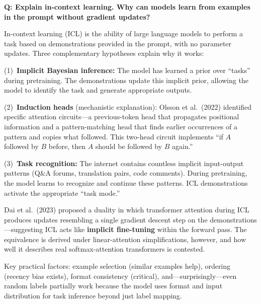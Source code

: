 \begin{interviewq}
\end{interviewq}

\begin{interviewq}
\textbf{Q: Explain in-context learning. Why can models learn from examples
in the prompt without gradient updates?}

 \quad {} \quad
\badgefreq{\freqhigh}

\stronganswer
In-context learning (ICL) is the ability of large language models to perform
a task based on demonstrations provided in the prompt, with no parameter
updates.  Three complementary hypotheses explain why it works:

(1)~\textbf{Implicit Bayesian inference:} The model has learned a prior over
``tasks'' during pretraining.  The demonstrations update this implicit prior,
allowing the model to identify the task and generate appropriate outputs.

(2)~\textbf{Induction heads} (mechanistic explanation): Olsson et al.\ (2022)
identified specific attention circuits---a previous-token head that propagates
positional information and a pattern-matching head that finds earlier
occurrences of a pattern and copies what followed.  This two-head circuit
implements ``if $A$ followed by $B$ before, then $A$ should be followed by $B$
again.''

(3)~\textbf{Task recognition:} The internet contains countless implicit
input-output patterns (Q\&A forums, translation pairs, code comments).
During pretraining, the model learns to recognize and continue these
patterns.  ICL demonstrations activate the appropriate ``task mode.''

Dai et al.\ (2023) proposed a duality in which transformer attention during
ICL produces updates resembling a single gradient descent step on the
demonstrations---suggesting ICL acts like \textbf{implicit fine-tuning}
within the forward pass.  The equivalence is derived under linear-attention
simplifications, however, and how well it describes real softmax-attention
transformers is contested.

Key practical factors: example selection (similar examples help), ordering
(recency bias exists), format consistency (critical), and---surprisingly---even
random labels partially work because the model uses format and input
distribution for task inference beyond just label mapping.


\end{interviewq}
